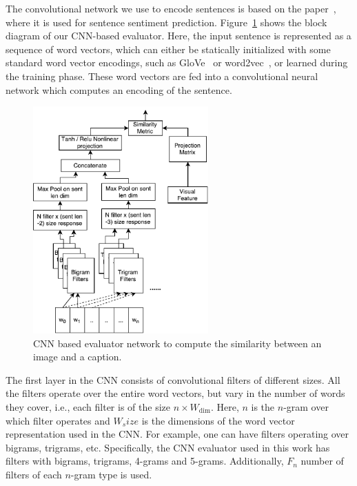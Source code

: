 The convolutional network we use to encode sentences is based on the
paper~\cite{kim:2014:CNNsent}, where it is used for sentence sentiment
prediction.
Figure~\ref{fig:CNNEval} shows the block diagram of our CNN-based evaluator.  
Here, the input sentence is represented as a sequence of word vectors, which can
either be statically initialized with some standard word vector encodings, such
as GloVe~\cite{pennington2014glove} or word2vec~\cite{mikolov2013distributed},
or learned during the training phase.
These word vectors are fed into a convolutional neural network which computes an
encoding of the sentence.


\begin{figure}[t] 
  \centering
  \includegraphics[width=0.6\textwidth]{./images/CnnEval.pdf} 
  \caption{CNN based evaluator network to compute the similarity between 
    an image and a caption.}
  \label{fig:CNNEval} 
\end{figure}


The first layer in the CNN consists of convolutional filters of different sizes.  
All the filters operate over the entire word vectors, but vary in the number of
words they cover, i.e., each filter is of the size $n \times
W_{\text{dim}}$. 
Here, $n$ is the $n$-gram over which filter operates and $W_size$ is the
dimensions of the word vector representation used in the CNN.
For example, one can have filters operating over bigrams, trigrams, etc.
Specifically, the CNN evaluator used in this work has filters with bigrams,
trigrams, 4-grams and 5-grams. 
Additionally, $F_n$ number of filters of each $n$-gram type is used.

